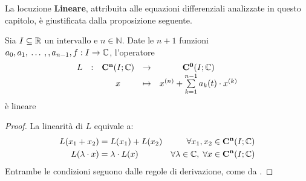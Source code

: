 La locuzione \textbf{Lineare}, attribuita alle equazioni differenziali analizzate in questo capitolo, è giustificata dalla proposizione seguente.
\begin{proposition}
	\label{prop:linearita_eq_diff}
	Sia $I\subseteq \mathbb{R}$ un intervallo e $n\in\mathbb{N}$. Date le $n+1$ funzioni $a_0,a_1,\:\dotsc\:,,a_{n-1},f:I\to\mathbb{C}$, l'operatore
	\begin{equation*}
		\begin{array}{ccccc} {L} & : & {\mathbf{C^{n}}(I;\mathbb{C})} & \to & {\mathbf{C^{0}}(I;\mathbb{C})} \\ & & {x} & \mapsto & {x^{(n)} + \sum\limits_{k=1}^{n-1}a_k(t) \cdot x^{(k)}} \\ \end{array}
	\end{equation*}
	è lineare
	\begin{proof}
		La linearità di $L$ equivale a:
		\begin{align*}
			L(x_1+x_2) &= L(x_1)+L(x_2) &\forall x_1,x_2\in \mathbf{C^{n}}(I;\mathbb{C})\\
			L(\lambda\cdot x) &= \lambda\cdot L(x) &\forall \lambda\in\mathbb{C},\;\forall x\in \mathbf{C^{n}}(I;\mathbb{C})
		\end{align*}
		Entrambe le condizioni  seguono dalle regole di derivazione, come da .
	\end{proof}
\end{proposition}

